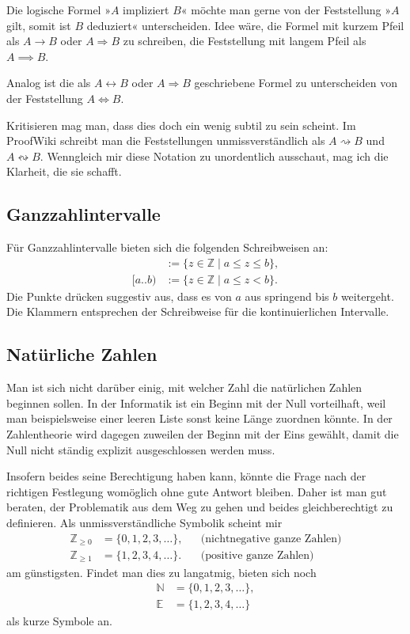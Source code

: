 \documentclass[a4paper,11pt,fleqn,twoside,BCOR=16mm]{scrartcl}
\newcommand{\N}{\mathbb N}
\newcommand{\Z}{\mathbb Z}
\begin{document}
Die logische Formel »$A$ impliziert $B$« möchte man gerne
von der Feststellung »$A$ gilt, somit ist $B$
deduziert« unterscheiden. Idee wäre, die Formel mit kurzem Pfeil als
$A\to B$ oder $A\Rightarrow B$ zu schreiben, die Feststellung mit
langem Pfeil als $A\implies B$.

Analog ist die als $A\leftrightarrow B$ oder $A\Rightarrow B$
geschriebene Formel zu unterscheiden von der Feststellung
$A\iff B$.

Kritisieren mag man, dass dies doch ein wenig subtil zu sein scheint.
Im ProofWiki schreibt man die Feststellungen unmissverständlich
als $A\rightsquigarrow B$ und $A\leftrightsquigarrow B$. Wenngleich
mir diese Notation zu unordentlich ausschaut, mag ich die Klarheit,
die sie schafft.

\subsection{Ganzzahlintervalle}

Für Ganzzahlintervalle bieten sich die folgenden Schreibweisen an:
\begin{align}
[a..b] &:= \{z\in\Z\mid a\le z\le b\},\\
[a..b) &:= \{z\in\Z\mid a\le z<b\}.
\end{align}
Die Punkte drücken suggestiv aus, dass es von $a$ aus springend
bis $b$ weitergeht. Die Klammern entsprechen der Schreibweise
für die kontinuierlichen Intervalle.

\subsection{Natürliche Zahlen}

Man ist sich nicht darüber einig, mit welcher Zahl die natürlichen
Zahlen beginnen sollen. In der Informatik ist ein Beginn mit der Null
vorteilhaft, weil man beispielsweise einer leeren Liste sonst keine
Länge zuordnen könnte. In der Zahlentheorie wird dagegen zuweilen der
Beginn mit der Eins gewählt, damit die Null nicht ständig explizit
ausgeschlossen werden muss.

Insofern beides seine Berechtigung haben kann, könnte die Frage nach
der richtigen Festlegung womöglich ohne gute Antwort bleiben. Daher
ist man gut beraten, der Problematik aus dem Weg zu gehen und beides
gleichberechtigt zu definieren. Als unmissverständliche Symbolik
scheint mir
\begin{align}
\Z_{\ge 0} &= \{0, 1, 2, 3, \ldots\}, && \text{(nichtnegative ganze Zahlen)}\\
\Z_{\ge 1} &= \{1, 2, 3, 4, \ldots\}. && \text{(positive ganze Zahlen)}
\end{align}
am günstigsten. Findet man dies zu langatmig, bieten sich noch
\begin{align}
\N &= \{0, 1, 2, 3, \ldots\},\\
\mathbb E &= \{1, 2, 3, 4, \ldots\}
\end{align}
als kurze Symbole an.
\end{document}
